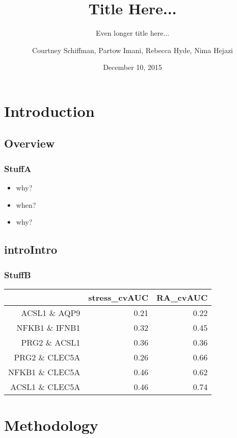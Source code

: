 \documentclass{beamer}
\title{Title Here...}
\subtitle{Even longer title here...}
\author{Courtney Schiffman, Partow Imani, Rebecca Hyde, Nima Hejazi}
\institute[UC Berkeley]{University of California, Berkeley}
\date{December 10, 2015}
\begin{document}
\frame{\titlepage}

\section[Outline]{}
\frame{\tableofcontents}


\section{Introduction}
\subsection{Overview}

\begin{frame}[fragile]
  	\frametitle{StuffA}

  		\begin{itemize}
  			\item why?
 			\item when?
  			\item why?     
  		\end{itemize}
\end{frame}

\subsection{introIntro}

\begin{frame}[fragile]
  	\frametitle{StuffB}
 		\begin{table}[ht]
  		\centering
  		\begin{tabular}{rrr}
   			\hline
   			& stress\_cvAUC & RA\_cvAUC \\ 
   			\hline
  			ACSL1 \& AQP9 & 0.21 & 0.22 \\ 
  			NFKB1 \& IFNB1 & 0.32 & 0.45 \\ 
  			PRG2 \& ACSL1 & 0.36 & 0.36 \\ 
  			PRG2 \& CLEC5A & 0.26 & 0.66 \\ 
  			NFKB1 \& CLEC5A & 0.46 & 0.62 \\ 
  			ACSL1 \& CLEC5A & 0.46 & 0.74 \\ 
   			\hline
		\end{tabular}
		\end{table}
\end{frame}

\section{Methodology}
\end{document}
